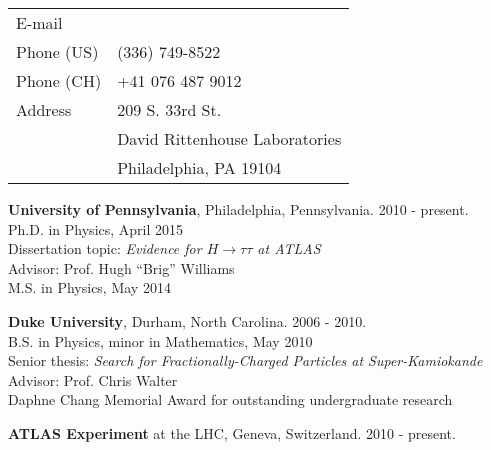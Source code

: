 \documentclass{resume2}
\begin{document}
\address{\Large{curriculum vitae}}

\begin{resume}

\vspace{0.2cm}

\hspace{-0.2cm}\begin{tabular}{l l}
E-mail & \underline{\color{blue}{\url{tuna@cern.ch}}} \\
Phone (US) & (336) 749-8522 \\
Phone (CH) & +41 076 487 9012 \\
Address & 209 S. 33rd St. \\
        & David Rittenhouse Laboratories \\
        & Philadelphia, PA 19104 \\
\end{tabular}

\vspace{0.2cm}

\textbf{University of Pennsylvania}, Philadelphia, Pennsylvania. 2010 - present. \\
Ph.D. in Physics, April 2015 \\
Dissertation topic: \textit{Evidence for $H\!\rightarrow\!\tau\tau$ at ATLAS} \\
Advisor: Prof. Hugh ``Brig'' Williams \\
M.S. in Physics, May 2014

\textbf{Duke University}, Durham, North Carolina. 2006 - 2010. \\
B.S. in Physics, minor in Mathematics, May 2010 \\
Senior thesis: \textit{Search for Fractionally-Charged Particles at Super-Kamiokande} \\
Advisor: Prof. Chris Walter \\
Daphne Chang Memorial Award for outstanding undergraduate research

\vspace{0.2cm}

\textbf{ATLAS Experiment} at the LHC, Geneva, Switzerland. 2010 - present.
\begin{itemize}


\end{itemize}
\end{resume}
\end{document}
